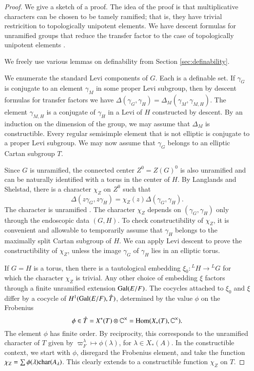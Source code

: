 \begin{proof}  
  We give a sketch of a proof.  The idea of the proof is that
  multiplicative characters can be chosen to be tamely ramified; that
  is, they have trivial restricition to topologically unipotent
  elements.  We have descent formulas for unramified groups that
  reduce the transfer factor to the case of topologically unipotent
  elements \cite{langlands2007descent} \cite{hales1993simple}
  \cite{langlands2007descent}.

  We freely use various lemmas on definability from Section
  \ref{sec:definability}.

  We enumerate the standard Levi components of $G$.  Each is a
  definable set.  If $\gamma_G$ is conjugate to an element $\gamma_M$
  in some proper Levi subgroup, then by descent formulas for transfer
  factors we have $\Delta(\gamma_G,\gamma_H) =
  \Delta_M(\gamma_M,\gamma_{M,H})$.  The element $\gamma_{M,H}$ is a
  conjugate of $\gamma_H$ in a Levi of $H$ constructed by descent.  By
  an induction on the dimension of the group, we may assume that
  $\Delta_M$ is constructible.  Every regular semisimple element that
  is not elliptic is conjugate to a proper Levi subgroup.  We may now
  assume that $\gamma_G$ belongs to an elliptic Cartan subgroup $T$.

  Since $G$ is unramified, the connected center $Z^0 = Z(G)^0$ is also
  unramified and can be naturally identified with a torus in the
  center of $H$.  By Langlands and Shelstad, there is a character
  $\chi_Z$ on $Z^0$ such that
\[
\Delta(z\gamma_G,z\gamma_H) = \chi_Z(z)\Delta(\gamma_G,\gamma_H).
\]
The character is unramified \cite{hales1993simple}.  The character
$\chi_Z$ depends on $(\gamma_G,\gamma_H)$ only through the endoscopic
data $(G,H)$.  To check constructibility of $\chi_Z$, it is convenient
and allowable to temporarily assume that $\gamma_H$ belongs to the
maximally split Cartan subgroup of $H$.  We can apply Levi descent
to prove the constructibility of $\chi_Z$,
unless the image $\gamma_G$ of $\gamma_H$ lies in an elliptic torus.

If $G=H$ is a torus, then there is a tautological embedding
$\xi_0:{}^LH \to {}^LG$ for which the character $\chi_Z$ is trivial.
Any other choice of embedding $\xi$ factors through a finite
unramified extension ${\operatorname{Gal}}(E/F)$.  The cocycles attached to
$\xi_0$ and $\xi$ differ by a cocycle of $H^1({\operatorname{Gal}}(E/F),\hat T)$,
determined by the value $\phi$ on the Frobenius
\[
\phi \in \hat T = X^*(T)\otimes \mathbb{C}^\times = {\operatorname{Hom}}(X_*(T),\mathbb{C}^\times).
\]
The element $\phi$ has finite order.
By reciprocity, this corresponds to the unramified character of $T$
given by $\varpi_F^\lambda\mapsto \phi(\lambda)$, for $\lambda\in
X_{*}(A)$.  In the constructible context, we start with $\phi$,
disregard the Frobenius element, and take the function
$\chi_Z = \sum \phi(\lambda){\operatorname{char}}(A_\lambda)$.
This clearly extends to a constructible function
$\chi_Z$ on $T$.


\end{proof}
